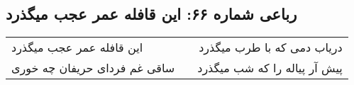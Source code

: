 \begin{center}
\section*{رباعی شماره ۶۶: این قافله عمر عجب میگذرد}
\label{sec:sh066}
\begin{longtable}{l p{0.5cm} r}
این قافله عمر عجب میگذرد
&&
دریاب دمی که با طرب میگذرد
\\
ساقی غم فردای حریفان چه خوری
&&
پیش آر پیاله را که شب میگذرد
\\
\end{longtable}
\end{center}
